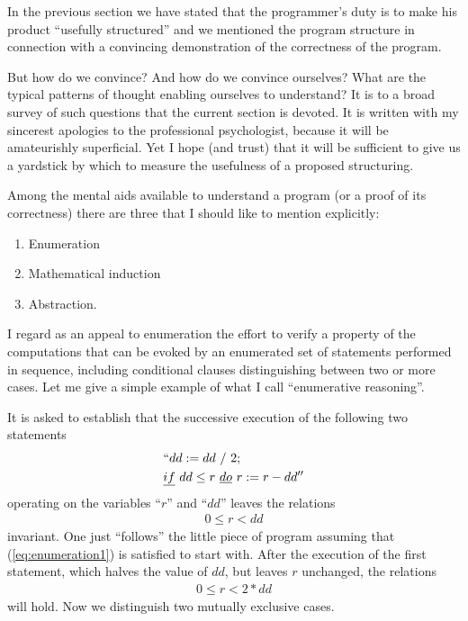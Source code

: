 In the previous section we have stated that the programmer's duty is to
make his product ``usefully structured'' and we mentioned the program structure
in connection with a convincing demonstration of the correctness of the program.

But how do we convince? And how do we convince ourselves? What are the
typical patterns of thought enabling ourselves to understand? It is to a broad
survey of such questions that the current section is devoted. It is written with
my sincerest apologies to the professional psychologist, because it will be
amateurishly superficial. Yet I hope (and trust) that it will be sufficient to
give us a yardstick by which to measure the usefulness of a proposed structuring.

Among the mental aids available to understand a program (or a proof of its
correctness) there are three that I should like to mention explicitly:
\begin{enumerate}[1) ]
    \item Enumeration
    \item Mathematical induction
    \item Abstraction.
\end{enumerate}


I regard as an appeal to enumeration the effort to verify a property of the
computations that can be evoked by an enumerated set of statements performed in
sequence, including conditional clauses distinguishing between two or more cases.
Let me give a simple example of what I call ``enumerative reasoning''.

It is asked to establish that the successive execution of the following two
statements
\begin{align*}
    &``dd:=dd\ /\ 2; \\
    &\underline{if}\  dd \leq r\ \underline{do}\ r:= r - dd''
\end{align*}
operating on the variables ``$r$'' and ``$dd$'' leaves the relations
\begin{align} \label{eq:enumeration1}
    0 \leq r < dd
\end{align}
invariant. One just ``follows'' the little piece of program assuming that
(\ref{eq:enumeration1}) is satisfied to start with. After the execution of the
first statement, which halves the value of $dd$, but leaves $r$ unchanged,
the relations
\begin{align} \label{eq:enumeration2}
0 \leq r < 2*dd
\end{align}
will hold. Now we distinguish two mutually exclusive cases.

